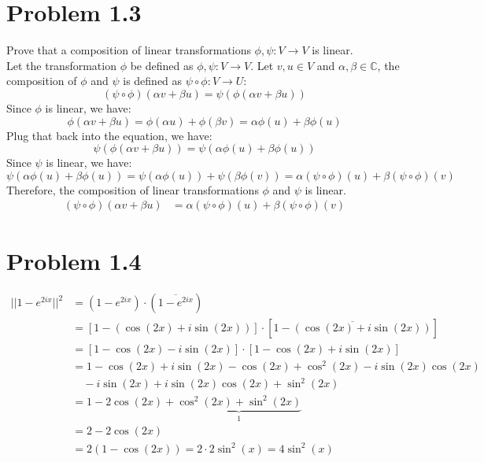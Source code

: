 \documentclass[12pt]{article}
\begin{document}
\section*{Problem 1.3}
Prove that a composition of linear transformations \(\phi, \psi: V \rightarrow V\) is linear.
\\
Let the transformation \(\phi\) be defined as \(\phi, \psi: V \rightarrow V\). Let \(v,u \in V\) and \(\alpha, \beta \in \mathbb{C}\),
the composition of \(\phi\) and \(\psi\) is defined as \(\psi \circ \phi: V \rightarrow U\):
\[(\psi \circ \phi)(\alpha v+ \beta u) = \psi(\phi(\alpha v+ \beta u))\]
Since \(\phi\) is linear, we have:
\[\phi(\alpha v+ \beta u) = \phi(\alpha u) + \phi(\beta v) = \alpha \phi(u) + \beta \phi(u)\]
Plug that back into the equation, we have:
\[ \psi(\phi(\alpha v+ \beta u))=\psi(\alpha \phi(u) + \beta \phi(u))\]
Since \(\psi\) is linear, we have:
\[\psi(\alpha \phi(u) + \beta \phi(u)) = \psi(\alpha \phi(u)) + \psi(\beta \phi(v)) = \alpha (\psi \circ \phi)(u) + \beta (\psi \circ \phi)(v)\]
Therefore, the composition of linear transformations \(\phi\) and \(\psi\) is linear.
\begin{align*}
    (\psi \circ \phi)(\alpha v+ \beta u) &= \alpha(\psi \circ \phi)(u) + \beta(\psi \circ \phi)(v)
\end{align*}
\section*{Problem 1.4}
\begin{align*}
    ||1 - e^{2ix}||^2 &= (1 - e^{2ix}) \cdot (\overline{1 - e^{2ix}}) \\
    &= [1 - (\cos(2x) + i\sin(2x))] \cdot [\overline{1 - (\cos(2x) + i\sin(2x))}] \\
    &= [1 - \cos(2x) - i\sin(2x)] \cdot [1 - \cos(2x) + i\sin(2x)] \\
    &= 1 - \cos(2x) + i\sin(2x) - \cos(2x) + \cos^2(2x) - i\sin(2x)\cos(2x) \\
    & \quad - i\sin(2x) + i\sin(2x)\cos(2x) + \sin^2(2x) \\
    &= 1 - 2\cos(2x) + \underbrace{\cos^2(2x) + \sin^2(2x)}_{1}\\
    &= 2 - 2\cos(2x) \\
    &= 2(1 - \cos(2x)) = 2 \cdot 2\sin^2(x) = 4\sin^2(x)
\end{align*}
\end{document}
